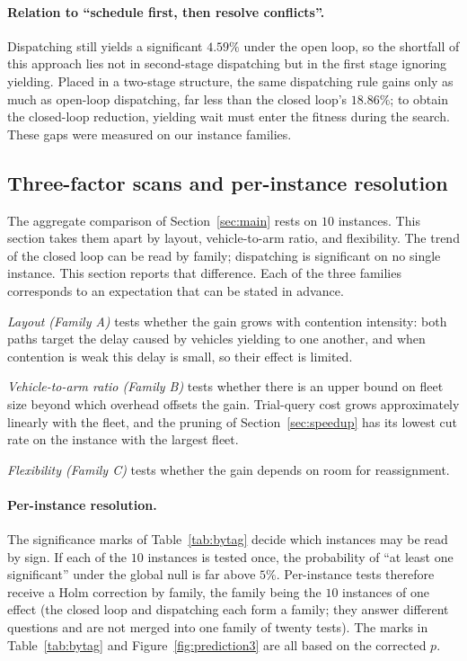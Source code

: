 \documentclass[manuscript,screen,review]{acmart}
\newcommand{\NCases}{10}
\newcommand{\GainLoopRule}{18.86\%}      %
\newcommand{\GainProbeOpen}{4.59\%}      %
\begin{document}
\paragraph{Relation to ``schedule first, then resolve conflicts''.}
Dispatching still yields a significant $\GainProbeOpen$ under the open loop, so the shortfall of this approach lies not in second-stage dispatching but in the first stage ignoring yielding. Placed in a two-stage structure, the same dispatching rule gains only as much as open-loop dispatching, far less than the closed loop's $\GainLoopRule$; to obtain the closed-loop reduction, yielding wait must enter the fitness during the search. These gaps were measured on our instance families.

\subsection{Three-factor scans and per-instance resolution}
\label{sec:whichcongestion}

The aggregate comparison of Section~\ref{sec:main} rests on $\NCases$ instances. This section takes them apart by layout, vehicle-to-arm ratio, and flexibility.
The trend of the closed loop can be read by family; dispatching is significant on no single instance. This section reports that difference. Each of the three families corresponds to an expectation that can be stated in advance.

\emph{Layout (Family A)} tests whether the gain grows with contention intensity: both paths target the delay caused by vehicles yielding to one another, and when contention is weak this delay is small, so their effect is limited.

\emph{Vehicle-to-arm ratio (Family B)} tests whether there is an upper bound on fleet size beyond which overhead offsets the gain. Trial-query cost grows approximately linearly with the fleet, and the pruning of Section~\ref{sec:speedup} has its lowest cut rate on the instance with the largest fleet.

\emph{Flexibility (Family C)} tests whether the gain depends on room for reassignment.

\paragraph{Per-instance resolution.}
The significance marks of Table~\ref{tab:bytag} decide which instances may be read by sign.
If each of the $\NCases$ instances is tested once, the probability of ``at least one significant'' under the global null is far above $5\%$.
Per-instance tests therefore receive a Holm correction by family, the family being the $\NCases$ instances of one effect (the closed loop and dispatching each form a family; they answer different questions and are not merged into one family of twenty tests).
The marks in Table~\ref{tab:bytag} and Figure~\ref{fig:prediction3} are all based on the corrected $p$.
\end{document}
